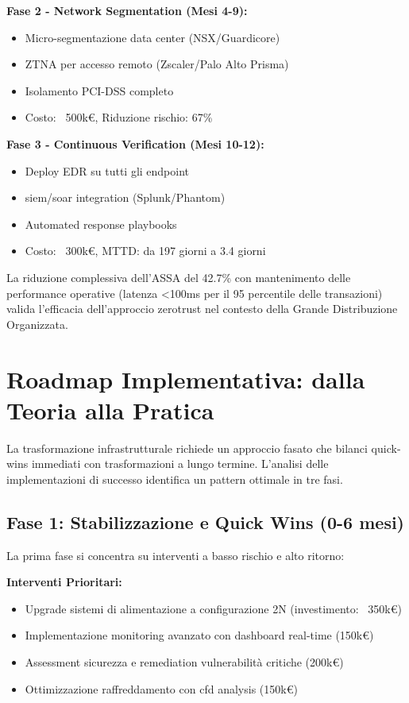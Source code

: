 \textbf{Fase 2 - Network Segmentation (Mesi 4-9):}
\begin{itemize}
    \item Micro-segmentazione data center (NSX/Guardicore)
    \item ZTNA per accesso remoto (Zscaler/Palo Alto Prisma)
    \item Isolamento PCI-DSS completo
    \item Costo: ~500k€, Riduzione rischio: 67\%
\end{itemize}

\textbf{Fase 3 - Continuous Verification (Mesi 10-12):}
\begin{itemize}
    \item Deploy EDR su tutti gli endpoint
    \item \gls{siem}/\gls{soar} integration (Splunk/Phantom)
    \item Automated response playbooks
    \item Costo: ~300k€, MTTD: da 197 giorni a 3.4 giorni
\end{itemize}

La riduzione complessiva dell'ASSA del 42.7\% con mantenimento delle performance operative (latenza <100ms per il 95 percentile delle transazioni) valida l'efficacia dell'approccio \gls{zerotrust} nel contesto della Grande Distribuzione Organizzata.

\section{\texorpdfstring{Roadmap Implementativa: dalla Teoria alla Pratica}{3.6 - Roadmap Implementativa: dalla Teoria alla Pratica}}

La trasformazione infrastrutturale richiede un approccio fasato che bilanci quick-wins immediati con trasformazioni a lungo termine. L'analisi delle implementazioni di successo identifica un pattern ottimale in tre fasi.

\subsection{\texorpdfstring{Fase 1: Stabilizzazione e Quick Wins (0-6 mesi)}{3.6.1 - Fase 1: Stabilizzazione e Quick Wins (0-6 mesi)}}

La prima fase si concentra su interventi a basso rischio e alto ritorno:

\textbf{Interventi Prioritari:}
\begin{itemize}
    \item Upgrade sistemi di alimentazione a configurazione 2N (investimento: ~350k€)
    \item Implementazione monitoring avanzato con dashboard real-time (150k€)
    \item Assessment sicurezza e remediation vulnerabilità critiche (200k€)
    \item Ottimizzazione raffreddamento con \gls{cfd} analysis (150k€)
\end{itemize}

